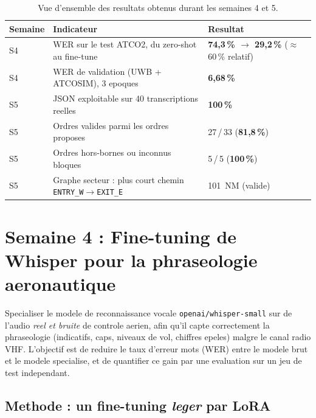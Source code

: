 \documentclass[11pt,a4paper]{article}
\begin{document}
\begin{table}[h]
\centering
\small
\begin{tabular}{>{\raggedright}p{2.0cm} >{\raggedright}p{7.7cm} l}
\toprule
\rowcolor{lightgray}\textbf{Semaine} & \textbf{Indicateur} & \textbf{Resultat}\\
\midrule
S4 & WER sur le test ATCO2, du zero-shot au fine-tune & \textbf{74,3\,\% $\rightarrow$ 29,2\,\%} ($\approx$60\,\% relatif)\\
S4 & WER de validation (UWB + ATCOSIM), 3 epoques & \textbf{6,68\,\%}\\
S5 & JSON exploitable sur 40 transcriptions reelles & \textbf{100\,\%}\\
S5 & Ordres valides parmi les ordres proposes & 27\,/\,33 (\textbf{81,8\,\%})\\
S5 & Ordres hors-bornes ou inconnus bloques & 5\,/\,5 (\textbf{100\,\%})\\
S5 & Graphe secteur : plus court chemin \texttt{ENTRY\_W}$\rightarrow$\texttt{EXIT\_E} & 101~NM (valide)\\
\bottomrule
\end{tabular}
\caption{Vue d'ensemble des resultats obtenus durant les semaines 4 et 5.}
\end{table}

\section{Semaine 4 : Fine-tuning de Whisper pour la phraseologie aeronautique}

\begin{objbox}
Specialiser le modele de reconnaissance vocale \texttt{openai/whisper-small} sur
de l'audio \emph{reel et bruite} de controle aerien, afin qu'il capte correctement
la phraseologie (indicatifs, caps, niveaux de vol, chiffres epeles) malgre le canal
radio VHF. L'objectif est de reduire le taux d'erreur mots (WER) entre le modele
brut et le modele specialise, et de quantifier ce gain par une evaluation sur un jeu
de test independant.
\end{objbox}

\subsection{Methode : un fine-tuning \emph{leger} par LoRA}
\end{document}
